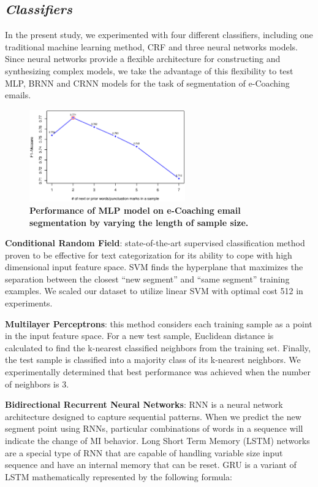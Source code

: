 \documentclass{amia}
\begin{document}
\subsection*{\textit{Classifiers}}

In the present study, we experimented with four different classifiers, including one traditional machine learning method, CRF and three neural networks models. Since neural networks provide a flexible architecture for constructing and synthesizing complex models, we take the advantage of this flexibility to test MLP, BRNN and CRNN models for the task of segmentation of e-Coaching emails.\\

\begin{figure}[!htb]
    \centering
    \includegraphics[width=0.60\textwidth]{figures/length-mlp.eps}
    \caption{\textbf{Performance of MLP model on e-Coaching email segmentation by varying the length of sample size.}}
    \label{fig:length-mlp}
\end{figure}

\textbf{Conditional Random Field}: state-of-the-art supervised classification method proven to be effective for text categorization\cite{joachims1998text} for its ability to cope with high dimensional input feature space. SVM finds the hyperplane that maximizes the separation between the closest ``new segment'' and ``same segment'' training examples. We scaled our dataset to utilize linear SVM with optimal cost 512 in experiments.   

\textbf{Multilayer Perceptrons}: this method considers each training sample as a point in the input feature space. For a new test sample, Euclidean distance is calculated to find the k-nearest classified neighbors from the training set. Finally, the test sample is classified into a majority class of its k-nearest neighbors. We experimentally determined that best performance was achieved when the number of neighbors is 3. 

\textbf{Bidirectional Recurrent Neural Networks}: RNN is a neural network architecture designed to capture sequential patterns. When we predict the new segment point using RNNs, particular combinations of words in a sequence will indicate the change of MI behavior. Long Short Term Memory (LSTM) networks\cite{hochreiter1997long} are a special type of RNN that are capable of handling variable size input sequence and have an internal memory that can be reset. GRU\cite{chung2014empirical} is a variant of LSTM mathematically represented by the following formula:
\end{document}
